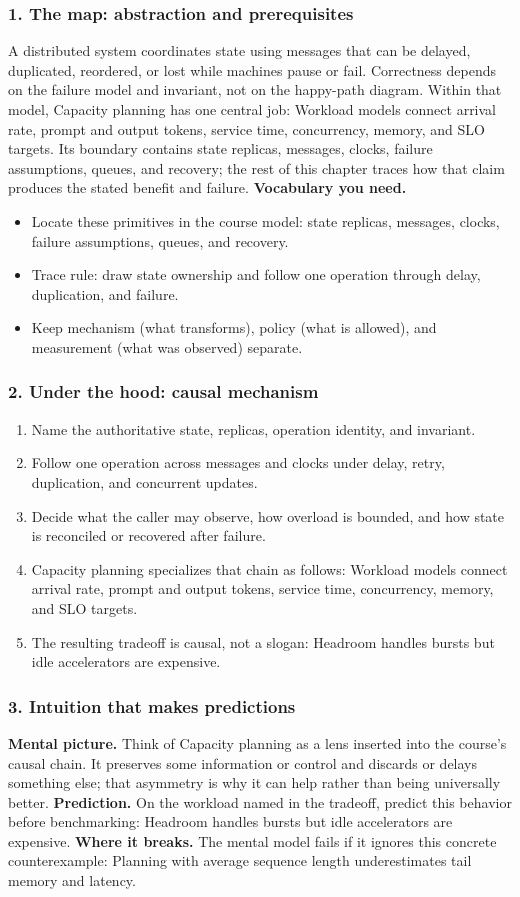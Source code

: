 \subsubsection*{1. The map: abstraction and prerequisites}
A distributed system coordinates state using messages that can be delayed, duplicated, reordered, or lost while machines pause or fail. Correctness depends on the failure model and invariant, not on the happy-path diagram.
Within that model, Capacity planning has one central job: Workload models connect arrival rate, prompt and output tokens, service time, concurrency, memory, and SLO targets. Its boundary contains state replicas, messages, clocks, failure assumptions, queues, and recovery; the rest of this chapter traces how that claim produces the stated benefit and failure.
\textbf{Vocabulary you need.}\begin{itemize}
\item Locate these primitives in the course model: state replicas, messages, clocks, failure assumptions, queues, and recovery.
\item Trace rule: draw state ownership and follow one operation through delay, duplication, and failure.
\item Keep mechanism (what transforms), policy (what is allowed), and measurement (what was observed) separate.
\end{itemize}
\subsubsection*{2. Under the hood: causal mechanism}\begin{enumerate}
\item Name the authoritative state, replicas, operation identity, and invariant.
\item Follow one operation across messages and clocks under delay, retry, duplication, and concurrent updates.
\item Decide what the caller may observe, how overload is bounded, and how state is reconciled or recovered after failure.
\item Capacity planning specializes that chain as follows: Workload models connect arrival rate, prompt and output tokens, service time, concurrency, memory, and SLO targets.
\item The resulting tradeoff is causal, not a slogan: Headroom handles bursts but idle accelerators are expensive.
\end{enumerate}
\subsubsection*{3. Intuition that makes predictions}
\textbf{Mental picture.} Think of Capacity planning as a lens inserted into the course's causal chain. It preserves some information or control and discards or delays something else; that asymmetry is why it can help rather than being universally better.
\textbf{Prediction.} On the workload named in the tradeoff, predict this behavior before benchmarking: Headroom handles bursts but idle accelerators are expensive.
\textbf{Where it breaks.} The mental model fails if it ignores this concrete counterexample: Planning with average sequence length underestimates tail memory and latency.
